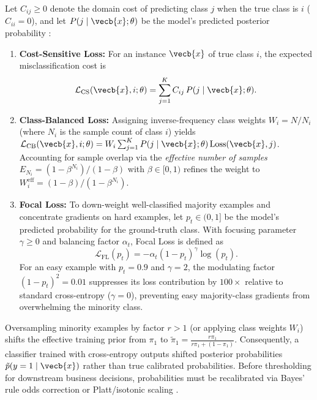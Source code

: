 \documentclass[../../../../master.tex]{subfiles}
\begin{document}
\begin{coremath}
Let $C_{ij} \ge 0$ denote the domain cost of predicting class $j$ when the true class is $i$ ($C_{ii} = 0$), and let $P(j \mid \vecb{x}; \theta)$ be the model's predicted posterior probability :
\begin{enumerate}
  \item \textbf{Cost-Sensitive Loss:} For an instance $\vecb{x}$ of true class $i$, the expected misclassification cost is
  \begin{equation}\label{eq:mlsys:cost_sensitive}
    \mathcal{L}_{\mathrm{CS}}(\vecb{x}, i; \theta) = \sum_{j=1}^{K} C_{ij}\, P(j \mid \vecb{x}; \theta).
  \end{equation}
  \item \textbf{Class-Balanced Loss:} Assigning inverse-frequency class weights $W_i = N / N_i$ (where $N_i$ is the sample count of class $i$) yields $\mathcal{L}_{\mathrm{CB}}(\vecb{x}, i; \theta) = W_i \sum_{j=1}^{K} P(j \mid \vecb{x}; \theta)\,\mathrm{Loss}(\vecb{x}, j)$. Accounting for sample overlap via the \emph{effective number of samples} $E_{N_i} = (1 - \beta^{N_i})/(1 - \beta)$ with $\beta \in [0, 1)$ refines the weight to $W_i^{\mathrm{eff}} = (1 - \beta)/(1 - \beta^{N_i})$.
  \item \textbf{Focal Loss:} To down-weight well-classified majority examples and concentrate gradients on hard examples, let $p_t \in (0, 1]$ be the model's predicted probability for the ground-truth class. With focusing parameter $\gamma \ge 0$ and balancing factor $\alpha_t$, Focal Loss is defined as
  \begin{equation}\label{eq:mlsys:focal_loss}
    \mathcal{L}_{\mathrm{FL}}(p_t) = -\alpha_t (1 - p_t)^{\gamma} \log(p_t).
  \end{equation}
  For an easy example with $p_t = 0.9$ and $\gamma = 2$, the modulating factor $(1 - p_t)^2 = 0.01$ suppresses its loss contribution by $100\times$ relative to standard cross-entropy ($\gamma = 0$), preventing easy majority-class gradients from overwhelming the minority class.
\end{enumerate}
\end{coremath}

\begin{intuition}
Oversampling minority examples by factor $r > 1$ (or applying class weights $W_i$) shifts the effective training prior from $\pi_1$ to $\tilde{\pi}_1 = \frac{r \pi_1}{r \pi_1 + (1 - \pi_1)}$. Consequently, a classifier trained with cross-entropy outputs shifted posterior probabilities $\tilde{p}(y=1 \mid \vecb{x})$ rather than true calibrated probabilities. Before thresholding for downstream business decisions, probabilities must be recalibrated via Bayes' rule odds correction or Platt/isotonic scaling .
\end{intuition}
\end{document}
